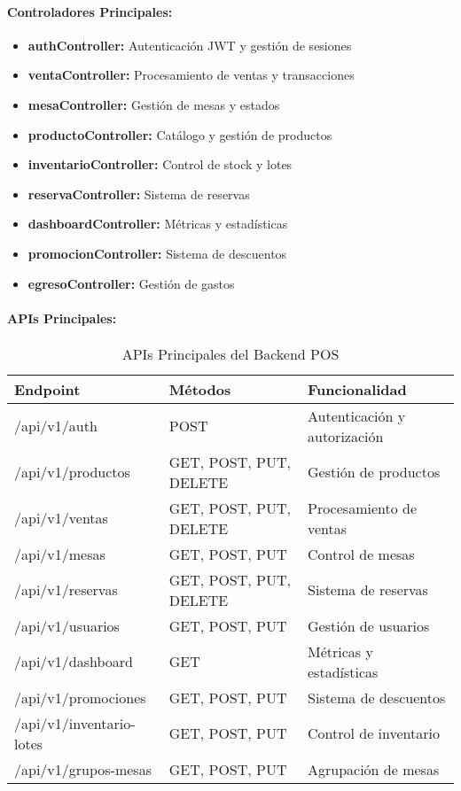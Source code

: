 \documentclass[12pt,a4paper]{article}
\begin{document}
\paragraph{Controladores Principales:}
\begin{itemize}
    \item \textbf{authController:} Autenticación JWT y gestión de sesiones
    \item \textbf{ventaController:} Procesamiento de ventas y transacciones
    \item \textbf{mesaController:} Gestión de mesas y estados
    \item \textbf{productoController:} Catálogo y gestión de productos
    \item \textbf{inventarioController:} Control de stock y lotes
    \item \textbf{reservaController:} Sistema de reservas
    \item \textbf{dashboardController:} Métricas y estadísticas
    \item \textbf{promocionController:} Sistema de descuentos
    \item \textbf{egresoController:} Gestión de gastos
\end{itemize}

\paragraph{APIs Principales:}

\begin{table}[H]
\centering
\small
\begin{tabular}{@{}llp{6cm}@{}}
\toprule
\textbf{Endpoint} & \textbf{Métodos} & \textbf{Funcionalidad} \\
\midrule
/api/v1/auth & POST & Autenticación y autorización \\
/api/v1/productos & GET, POST, PUT, DELETE & Gestión de productos \\
/api/v1/ventas & GET, POST, PUT, DELETE & Procesamiento de ventas \\
/api/v1/mesas & GET, POST, PUT & Control de mesas \\
/api/v1/reservas & GET, POST, PUT, DELETE & Sistema de reservas \\
/api/v1/usuarios & GET, POST, PUT & Gestión de usuarios \\
/api/v1/dashboard & GET & Métricas y estadísticas \\
/api/v1/promociones & GET, POST, PUT & Sistema de descuentos \\
/api/v1/inventario-lotes & GET, POST, PUT & Control de inventario \\
/api/v1/grupos-mesas & GET, POST, PUT & Agrupación de mesas \\
\bottomrule
\end{tabular}
\caption{APIs Principales del Backend POS}
\end{table}
\end{document}
